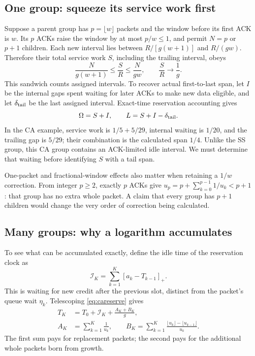 \documentclass[sigconf,nonacm]{acmart}
\begin{document}
\subsection{One group: squeeze its service work first}
Suppose a parent group has $p=\lfloor w\rfloor$ packets and the window
before its first ACK is $w$. Its $p$ ACKs raise the window by at most
$p/w\le1$, and permit $N=p$ or $p+1$ children. Each new interval lies
between $R/[g(w+1)]$ and $R/(gw)$. Therefore their total service work $S$,
including the trailing interval, obeys
\begin{equation}
 \frac{N}{g(w+1)}\le\frac SR\le\frac{N}{gw},
 \qquad\frac SR\longrightarrow\frac1g.
 \label{eq:caservicesandwich}
\end{equation}
This sandwich counts assigned intervals. To recover actual first-to-last
span, let $I$ be the internal gaps spent waiting for later ACKs to make
new data eligible, and let $\delta_{\rm tail}$ be the last assigned interval.
Exact-time reservation accounting gives
\begin{equation}
 \Omega=S+I,\qquad L=S+I-\delta_{\rm tail}.
 \label{eq:caworkspan}
\end{equation}
In the CA example, service work is $1/5+5/29$, internal waiting is $1/20$,
and the trailing gap is $5/29$; their combination is the calculated
span $1/4$. Unlike the SS group, this CA group contains an ACK-limited
idle interval. We must determine that waiting before identifying $S$ with
a tail span.

One-packet and fractional-window effects also matter when retaining a
$1/w$ correction. From integer $p\ge2$, exactly $p$ ACKs give
$u_p=p+\sum_{k=0}^{p-1}1/u_k<p+1$: that group has no extra whole packet.
A claim that every group has $p+1$ children would change the very order
of correction being calculated.

\subsection{Many groups: why a logarithm accumulates}
To see what can be accumulated exactly, define the idle time of the reservation clock as
\[
 \mathcal I_K=\sum_{k=1}^K[a_k-T_{k-1}]_+.
\]
This is waiting for new credit after the previous slot, distinct from the packet's queue wait $\eta_k$. Telescoping \eqref{eq:careserve} gives
\begin{equation}\begin{aligned}
 T_K&=T_0+\mathcal I_K+\frac{A_K+B_K}{g},\\
 A_K&=\sum_{k=1}^K\frac1{u_k},\qquad
 B_K=\sum_{k=1}^K\frac{\lfloor u_k\rfloor-\lfloor u_{k-1}\rfloor}{u_k}.
\end{aligned}\label{eq:caservice}\end{equation}
The first sum pays for replacement packets; the second pays for the additional whole packets born from growth.
\end{document}
